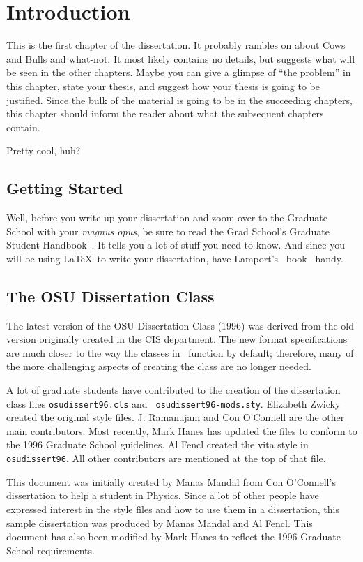 \chapter{Introduction}
\label{intro.ch}

This is the first chapter of the dissertation. It probably rambles on
about Cows and Bulls and what-not.  It most likely contains no
details, but suggests what will be seen in the other chapters.  Maybe
you can give a glimpse of ``the problem'' in this chapter, state your
thesis, and suggest how your thesis is going to be justified. Since
the bulk of the material is going to be in the succeeding chapters,
this chapter should inform the reader about what the subsequent
chapters contain.

Pretty cool, huh?

\section{Getting Started}

Well, before you write up your dissertation and zoom over to the
Graduate School with your {\em magnus opus}, be sure to read the Grad
School's Graduate Student Handbook~\cite{osu:guidelines}. It tells you a lot of
stuff you need to know. And since you will be using \LaTeX\ to write
your dissertation, have Lamport's \LaTeXe\ book~\cite{lamport:latex}
handy.

\section{The OSU Dissertation Class}

The latest version of the OSU Dissertation Class (1996) was derived from
the old version originally created in the CIS department.  The new format
specifications are much closer to the way the classes in \LaTeXe\ function
by default; therefore, many of the more challenging aspects of creating the
class are no longer needed.

A lot of graduate students have contributed to the
creation of the dissertation class files {\tt osudissert96.cls} and {\tt
osudissert96-mods.sty}. Elizabeth Zwicky created the original style files. J.
Ramanujam and Con O'Connell are the other main contributors.  Most
recently, Mark Hanes has updated the files to conform to the 1996
Graduate School guidelines.  Al Fencl created
the vita style in {\tt osudissert96}. All other contributors are mentioned
at the top of that file.

This document was initially created by Manas Mandal from Con O'Connell's
dissertation to help a student in Physics.  Since a lot of other people
have expressed interest in the style files and how to use them in a
dissertation, this sample dissertation was produced by Manas Mandal and Al
Fencl.  This document has also been modified by Mark Hanes to reflect the
1996 Graduate School requirements.

